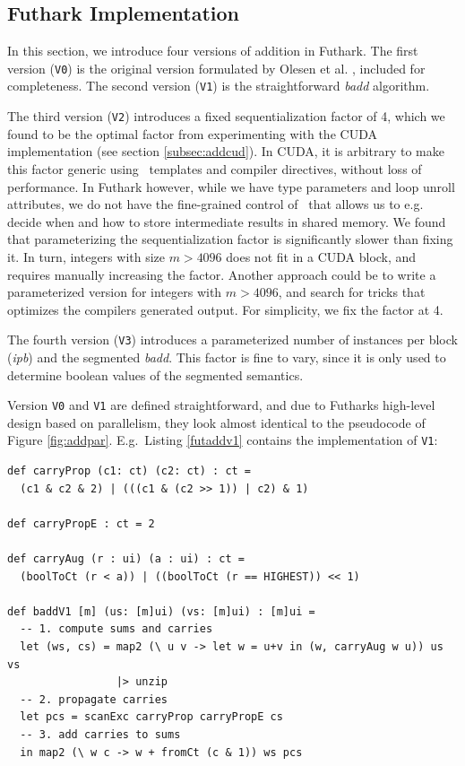 \subsection{Futhark Implementation}
\label{subsec:addfut}

In this section, we introduce four versions of addition in Futhark. The first
version (\texttt{V0}) is the original version formulated by Olesen et
al. \cite{DPPproject}, included for completeness. The second version
(\texttt{V1}) is the straightforward \textit{badd} algorithm.

The third version (\texttt{V2}) introduces a fixed sequentialization factor of
4, which we found to be the optimal factor from experimenting with the CUDA
implementation (see section \ref{subsec:addcud}). In CUDA, it is arbitrary to
make this factor generic using \cpp\ templates and compiler directives, without
loss of performance. In Futhark however, while we have type parameters and loop
unroll attributes, we do not have the fine-grained control of \cpp\ that allows
us to e.g. decide when and how to store intermediate results in shared
memory. We found that parameterizing the sequentialization factor is
significantly slower than fixing it. In turn, integers with size $m>4096$ does
not fit in a CUDA block, and requires manually increasing the factor. Another
approach could be to write a parameterized version for integers with $m>4096$,
and search for tricks that optimizes the compilers generated output. For
simplicity, we fix the factor at 4.

The fourth version (\texttt{V3}) introduces a parameterized number of instances
per block (\textit{ipb}) and the segmented \textit{badd}. This factor is fine to
vary, since it is only used to determine boolean values of the segmented
semantics.

Version \texttt{V0} and \texttt{V1} are defined straightforward, and due to
Futharks high-level design based on parallelism, they look almost identical to
the pseudocode of Figure \ref{fig:addpar}. E.g.\ Listing \ref{futaddv1} contains
the implementation of \texttt{V1}:
\begin{lstlisting}[language=futhark,caption={\footnotesize Futhark \textit{badd} \texttt{V1} using base \texttt{ui} and carry type \texttt{ct} (from file \texttt{add.fut} slightly edited).},label={futaddv1}]
def carryProp (c1: ct) (c2: ct) : ct =
  (c1 & c2 & 2) | (((c1 & (c2 >> 1)) | c2) & 1)

def carryPropE : ct = 2

def carryAug (r : ui) (a : ui) : ct =
  (boolToCt (r < a)) | ((boolToCt (r == HIGHEST)) << 1)

def baddV1 [m] (us: [m]ui) (vs: [m]ui) : [m]ui =
  -- 1. compute sums and carries
  let (ws, cs) = map2 (\ u v -> let w = u+v in (w, carryAug w u)) us vs
                 |> unzip
  -- 2. propagate carries
  let pcs = scanExc carryProp carryPropE cs
  -- 3. add carries to sums
  in map2 (\ w c -> w + fromCt (c & 1)) ws pcs
\end{lstlisting}

